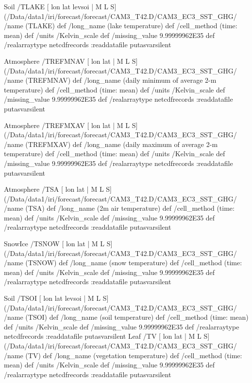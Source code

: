 \begin{ingrid}
Soil /TLAKE{
[ lon lat levsoi | M L S] (/Data/data1/iri/forecast/forecast/CAM3_T42.D/CAM3_EC3_SST_GHG/%
/name (TLAKE) def
 /long_name (lake temperature) def
 /cell_method (time: mean) def
 /units /Kelvin_scale def
 /missing_value 9.99999962E35 def
 /realarraytype netcdfrecords :readdatafile
}putasvarsilent

Atmosphere /TREFMNAV{
[ lon lat | M L S] (/Data/data1/iri/forecast/forecast/CAM3_T42.D/CAM3_EC3_SST_GHG/%
/name (TREFMNAV) def
 /long_name (daily minimum of average 2-m temperature) def
 /cell_method (time: mean) def
 /units /Kelvin_scale def
 /missing_value 9.99999962E35 def
 /realarraytype netcdfrecords :readdatafile
}putasvarsilent



Atmosphere /TREFMXAV{
[ lon lat | M L S] (/Data/data1/iri/forecast/forecast/CAM3_T42.D/CAM3_EC3_SST_GHG/%
/name (TREFMXAV) def
 /long_name (daily maximum of average 2-m temperature) def
 /cell_method (time: mean) def
 /units /Kelvin_scale def
 /missing_value 9.99999962E35 def
 /realarraytype netcdfrecords :readdatafile
}putasvarsilent

Atmosphere /TSA{
[ lon lat | M L S] (/Data/data1/iri/forecast/forecast/CAM3_T42.D/CAM3_EC3_SST_GHG/%
/name (TSA) def
 /long_name (2m air temperature) def
 /cell_method (time: mean) def
 /units /Kelvin_scale def
 /missing_value 9.99999962E35 def
 /realarraytype netcdfrecords :readdatafile
}putasvarsilent


SnowIce /TSNOW{
[ lon lat | M L S] (/Data/data1/iri/forecast/forecast/CAM3_T42.D/CAM3_EC3_SST_GHG/%
/name (TSNOW) def
 /long_name (snow temperature) def
 /cell_method (time: mean) def
 /units /Kelvin_scale def
 /missing_value 9.99999962E35 def
 /realarraytype netcdfrecords :readdatafile
}putasvarsilent


Soil /TSOI{
[ lon lat levsoi | M L S] (/Data/data1/iri/forecast/forecast/CAM3_T42.D/CAM3_EC3_SST_GHG/%
/name (TSOI) def
 /long_name (soil temperature) def
 /cell_method (time: mean) def
 /units /Kelvin_scale def
 /missing_value 9.99999962E35 def
 /realarraytype netcdfrecords :readdatafile
}putasvarsilent
Leaf /TV{
[ lon lat | M L S] (/Data/data1/iri/forecast/forecast/CAM3_T42.D/CAM3_EC3_SST_GHG/%
/name (TV) def
 /long_name (vegetation temperature) def
 /cell_method (time: mean) def
 /units /Kelvin_scale def
 /missing_value 9.99999962E35 def
 /realarraytype netcdfrecords :readdatafile
}putasvarsilent



\end{ingrid}
